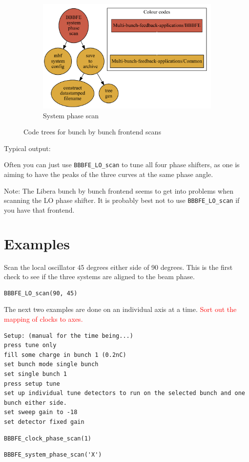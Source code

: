 \documentclass{report}
\begin{document}
\begin{figure}[hbt]
    ~ %
    \begin{subfigure}[b]{0.3\textwidth}
        \includegraphics[width=\textwidth]{BBBFE_system_phase_scan.pdf}
        \caption{System phase scan}
        \label{fig:system_phase_scan}
    \end{subfigure}
    \caption{Code trees for bunch by bunch frontend scans}\label{fig:BBBFE_code_trees}
\end{figure}

Typical output:

Often you can just use \verb|BBBFE_LO_scan| to tune all four phase shifters, as one is aiming to have the peaks of the three curves at the same phase angle.

Note: The Libera bunch by bunch frontend seems to get into problems when scanning the LO phase shifter. It is probably best not to use \verb|BBBFE_LO_scan| if you have that frontend.
\section{Examples}

Scan the local oscillator 45 degrees either side of 90 degrees. This is the first check to see if the three systems are aligned to the beam phase.
\begin{verbatim}
BBBFE_LO_scan(90, 45)
\end{verbatim}

The next two examples are done on an individual axis at a time. \textcolor{red}{Sort out the mapping of clocks to axes.}
\begin{verbatim}
Setup: (manual for the time being...)
press tune only
fill some charge in bunch 1 (0.2nC)
set bunch mode single bunch
set single bunch 1
press setup tune
set up individual tune detectors to run on the selected bunch and one bunch either side.
set sweep gain to -18
set detector fixed gain
\end{verbatim}
\begin{verbatim}
BBBFE_clock_phase_scan(1)
\end{verbatim}
\begin{verbatim}
BBBFE_system_phase_scan('X')
\end{verbatim}
\end{document}
